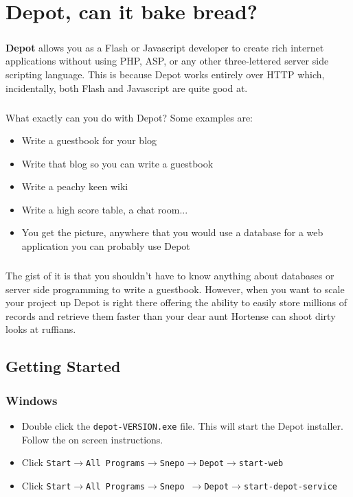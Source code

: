 \documentclass{report}
\begin{document}
\setlength{\headsep}{16pt}

\chapter{Depot, can it bake bread?}

\paragraph{}
\textbf{Depot} allows you as a Flash or Javascript developer to create
rich internet applications without using PHP, ASP, or any other
three-lettered server side scripting language. This is because Depot
works entirely over HTTP which, incidentally, both Flash and
Javascript are quite good at.

\paragraph{}
What exactly can you do with Depot? Some examples are: 
\begin{itemize}
\item Write a guestbook for your blog
\item Write that blog so you can write a guestbook
\item Write a peachy keen wiki
\item Write a high score table, a chat room...
\item You get the picture, anywhere that you would use a database for
  a web application you can probably use Depot
\end{itemize}

\paragraph{}
The gist of it is that you shouldn't have to know anything about
databases or server side programming to write a guestbook. However,
when you want to scale your project up Depot is right there offering
the ability to easily store millions of records and retrieve them
faster than your dear aunt Hortense can shoot dirty looks at ruffians.


\section{Getting Started}
\subsection{Windows}
\begin{itemize}
\item Double click the \texttt{depot-VERSION.exe} file. This will start the
  Depot installer. Follow the on screen instructions.
\item Click \texttt{Start$\rightarrow$All Programs$\rightarrow$Snepo$\rightarrow$Depot$\rightarrow$start-web}
\item Click \texttt{Start$\rightarrow$All Programs$\rightarrow$Snepo
$\rightarrow$Depot$\rightarrow$start-depot-service}
\end{itemize}
\end{document}
